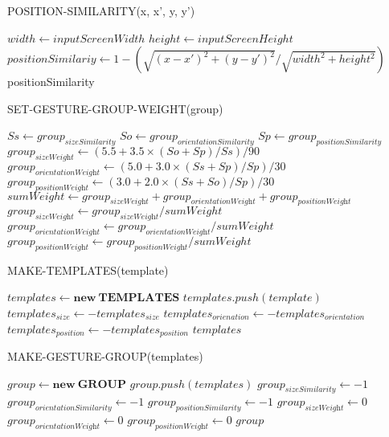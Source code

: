\begin{algorithm}
  \caption*{POSITION-SIMILARITY(x, x', y, y')}
  \begin{algorithmic}[1]
      \State$width\gets inputScreenWidth$
    \State$height\gets inputScreenHeight$
  \State $positionSimilariy\gets 1 - (\sqrt{(x - x')^2 + (y - y')^2} / \sqrt{width^2 + height^2})$
   \Return positionSimilarity
\end{algorithmic}
\end{algorithm}

\begin{algorithm}
  \caption*{SET-GESTURE-GROUP-WEIGHT(group)}
  \begin{algorithmic}[1]
  \State $Ss\gets group_\textit{sizeSimilarity}$
   \State $So\gets group_\textit{orientationSimilarity}$
    \State $Sp\gets group_\textit{positionSimilarity}$
  \State $group_\textit{sizeWeight}\gets (5.5 + 3.5\times (So + Sp) / Ss) / 90$
  \State $group_\textit{orientationWeight}\gets (5.0 + 3.0\times (Ss + Sp) / Sp) / 30$
  \State $group_\textit{positionWeight}\gets (3.0 + 2.0\times (Ss + So) / Sp) / 30$
  \State $sumWeight\gets group_\textit{sizeWeight} + group_\textit{orientationWeight} + group_\textit{positionWeight}$
  \State $group_\textit{sizeWeight}\gets group_\textit{sizeWeight} / sumWeight$
  \State $group_\textit{orientationWeight}\gets group_\textit{orientationWeight} / sumWeight$
  \State $group_\textit{positionWeight}\gets group_\textit{positionWeight} / sumWeight$
\end{algorithmic}
\end{algorithm}

\begin{algorithm}
  \caption*{MAKE-TEMPLATES(template)}
  \begin{algorithmic}[1]
  \State $templates\gets \textbf{new}\: \textbf{TEMPLATES}$
  \State $templates.push(template)$
  \State $templates_\textit{size}\gets - templates_\textit{size}$
  \State $templates_\textit{orienation}\gets - templates_\textit{orientation}$
  \State $templates_\textit{position}\gets - templates_\textit{position}$
  \Return $templates$
\end{algorithmic}
\end{algorithm}

\begin{algorithm}
  \caption*{MAKE-GESTURE-GROUP(templates)}
  \begin{algorithmic}[1]
   \State $group\gets \textbf{new}\: \textbf{GROUP}$
  \State $group.push(templates)$
  \State $group_\textit{sizeSimilarity}\gets -1$
  \State $group_\textit{orientationSimilarity}\gets -1$
  \State $group_\textit{positionSimilarity}\gets -1$
  \State $group_\textit{sizeWeight}\gets 0$
  \State $group_\textit{orientationWeight}\gets 0$
  \State $group_\textit{positionWeight}\gets 0$
  \Return $group$
\end{algorithmic}
\end{algorithm}

